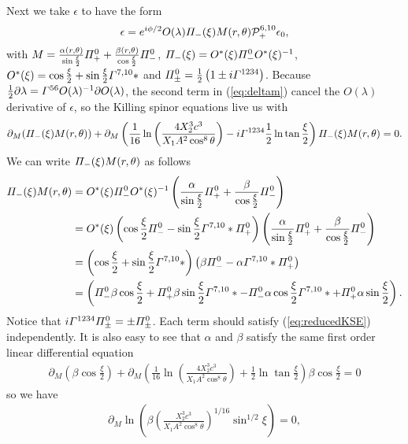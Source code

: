 \documentclass[11pt]{article}
\let\oldGamma=\Gamma
\let\oldPi=\Pi
\renewcommand{\Gamma}{\mathnormal{\oldGamma}}
\renewcommand{\Pi}{\mathnormal{\oldPi}}
\newcommand{\sfrac}[2]{{\textstyle\frac{#1}{#2}}}
\newcommand{\p}{\partial}\newcommand{\quarter}{\sfrac{1}{4}}
\begin{document}
Next we take $\epsilon$ to have the form
\begin{align}
\epsilon
= e^{i\phi/2}O(\lambda) \Pi_-(\xi) M(r,\theta)  \mathcal{P}_+^{6,10}  \epsilon_0,
\end{align}
with $M = \frac{\alpha(r,\theta)}{\sin\frac{\xi}{2}}\Pi^0_+ + \frac{\beta(r,\theta)}{\cos\frac{\xi}{2}}\Pi^0_-$,
$\Pi_-(\xi) = O^*(\xi)\Pi_-^0 O^*(\xi)^{-1}$, $O^*(\xi) = \cos\frac{\xi}{2} + \sin\frac{\xi}{2}\Gamma^{7,10}*$ and $\Pi_\pm^0 = \frac{1}{2}\left(1 \pm i\Gamma^{1234}\right)$.
Because $\frac{1}{2}\p\lambda = \Gamma^{56}  O(\lambda)^{-1} \p O(\lambda)$, the second term in (\ref{eq:deltam}) cancel the $O(\lambda)$ derivative of $\epsilon$, so the Killing spinor equations live us with
\begin{align}\label{eq:reducedKSE}
\p_M(\Pi_-(\xi) M(r,\theta)  ) + \p_M \left(
\frac{1}{16}\ln\left(\frac{4 X_2^3 c^3}{X_1 A^{2} \cos^8\theta}\right)
-i\Gamma^{1234} \frac{1}{2}\ln\tan\frac{\xi}{2} \right)\Pi_-(\xi) M(r,\theta) =0.
\end{align}
We can write $\Pi_-(\xi) M(r,\theta)$ as follows
\begin{align}
\Pi_-(\xi) M(r,\theta)
& = O^*(\xi)\Pi_-^0 O^*(\xi)^{-1}\left(\frac{\alpha}{\sin\frac{\xi}{2}}\Pi^0_+ + \frac{\beta}{\cos\frac{\xi}{2}}\Pi^0_-\right)\nonumber\\
& = O^*(\xi)\left(\cos\frac{\xi}{2}\Pi_-^0  - \sin\frac{\xi}{2}\Gamma^{7,10}*\Pi_+^0 \right)\left(\frac{\alpha}{\sin\frac{\xi}{2}}\Pi^0_+ + \frac{\beta}{\cos\frac{\xi}{2}}\Pi^0_-\right)\nonumber\\
& = \left(\cos\frac{\xi}{2} + \sin\frac{\xi}{2}\Gamma^{7,10}*\right)
\left(\beta\Pi_-^0  - \alpha\Gamma^{7,10}*\Pi_+^0 \right)\nonumber\\
& =
\left(\Pi_-^0\beta\cos\frac{\xi}{2} + \Pi_+^0  \beta\sin\frac{\xi}{2}\Gamma^{7,10}*
- \Pi_-^0\alpha\cos\frac{\xi}{2}\Gamma^{7,10}* + \Pi_+^0\alpha \sin\frac{\xi}{2} \right).
\end{align}
Notice that $i\Gamma^{1234}\Pi_\pm^0 = \pm \Pi_\pm^0$.
Each term should satisfy (\ref{eq:reducedKSE}) independently. It is also easy to see that $\alpha$ and $\beta$ satisfy the same first order linear differential equation
\begin{align}
\p_M\left(\beta\cos\frac{\xi}{2}\right) + \p_M \left(
\frac{1}{16}\ln\left(\frac{4 X_2^3 c^3}{X_1 A^{2} \cos^8\theta}\right)
+\frac{1}{2}\ln\tan\frac{\xi}{2} \right)\beta\cos\frac{\xi}{2} = 0
\end{align}
so we have
\begin{align}
\p_M\ln \left(\beta\left(\frac{X_2^3 c^3}{X_1 A^{2} \cos^8\theta}\right)^{1/16}\sin^{1/2}\xi \right) = 0,
\end{align}
\end{document}

